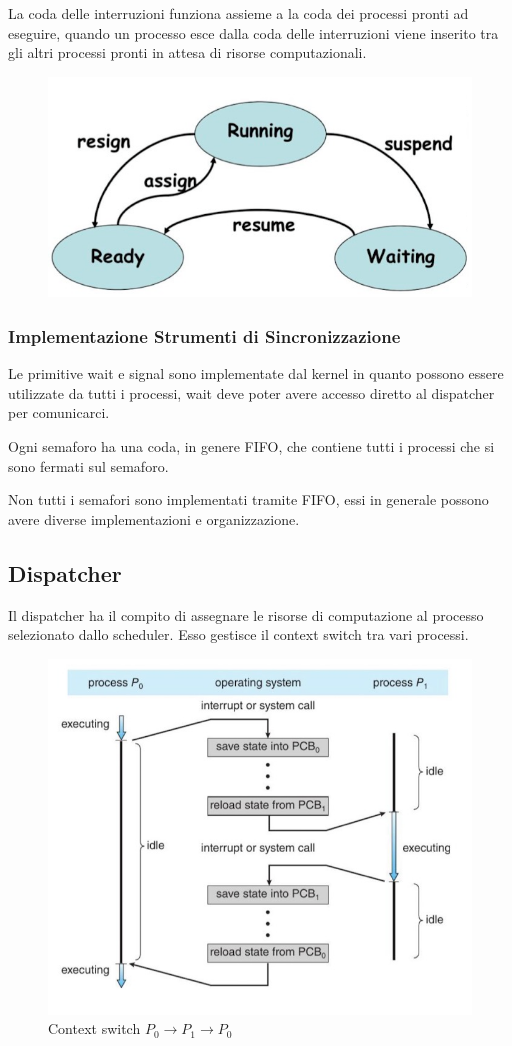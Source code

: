 La coda delle interruzioni funziona assieme a la coda dei processi pronti ad eseguire, quando un processo esce dalla coda delle interruzioni viene inserito tra gli altri processi pronti in attesa di risorse computazionali.

\begin{figure}[H]
    \centering
    \includegraphics[width=0.45\linewidth]{assets/process-lifecycle.png}
\end{figure}

\subsubsection{Implementazione Strumenti di Sincronizzazione}
Le primitive wait e signal sono implementate dal kernel in quanto possono essere utilizzate da tutti i processi, wait deve poter avere accesso diretto al dispatcher per comunicarci.

\spacer
Ogni semaforo ha una coda, in genere FIFO, che contiene tutti i processi che si sono fermati sul semaforo.

\begin{note}
    Non tutti i semafori sono implementati tramite FIFO, essi in generale possono avere diverse implementazioni e organizzazione.
\end{note}

\subsection{Dispatcher}
Il dispatcher ha il compito di assegnare le risorse di computazione al processo selezionato dallo scheduler. Esso gestisce il context switch tra vari processi.

\begin{figure}[H]
    \centering
    \includegraphics[width=0.5\linewidth]{assets/dispatcher.jpg}
    \caption{Context switch $P_0 \rightarrow P_1 \rightarrow P_0$ }
\end{figure}

